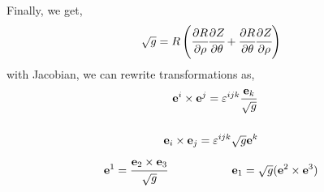 Finally, we get,
\begin{equation}
    \jac =  R \left( \dRr  \dZt +      
        \dRt  \dZr \right)   \label{jacobian}
\end{equation}
with Jacobian, we can rewrite transformations as,
\begin{align}
    \e^i \times \e^j = \varepsilon^{ijk} \frac{\e_k}{\jac} \label{icrossj} \\[.5cm]
    \e_i \times \e_j = \varepsilon^{ijk} \jac \e^k
\end{align}
\begin{equation}
    \e^1 = \cfrac{\e_2 \times \e_3}{\jac} \hspace{2cm} \e_1 = \jac (\e^2 \times \e^3)
\end{equation}

